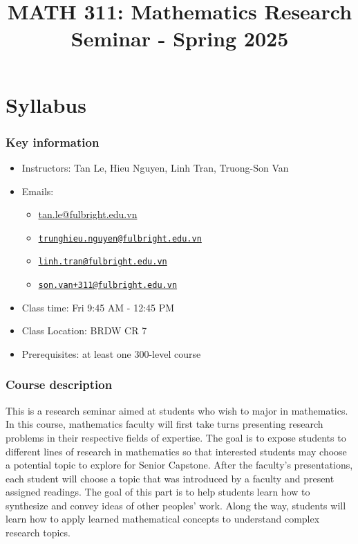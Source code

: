 \documentclass[
  openany]{book}
\title{MATH 311: Mathematics Research Seminar - Spring 2025}
\author{}
\date{\vspace{-2.5em}}
\providecommand{\tightlist}{%
  \setlength{\itemsep}{0pt}\setlength{\parskip}{0pt}}
\begin{document}
\maketitle

\chapter*{Syllabus}\label{syllabus}

\subsection*{Key information}\label{key-information}

\begin{itemize}
\tightlist
\item
  Instructors: Tan Le, Hieu Nguyen, Linh Tran, Truong-Son Van
\item
  Emails:

  \begin{itemize}
  \tightlist
  \item
    \href{mailto:tan.le@fulgright.edu.vn}{tan.le@fulbright.edu.vn}
  \item
    \href{mailto:trunghieu.nguyen@fulbright.edu.vn}{\nolinkurl{trunghieu.nguyen@fulbright.edu.vn}}
  \item
    \href{mailto:linh.tran@fulbright.edu.vn}{\nolinkurl{linh.tran@fulbright.edu.vn}}
  \item
    \href{mailto:son.van+311@fulbright.edu.vn}{\nolinkurl{son.van+311@fulbright.edu.vn}}
  \end{itemize}
\item
  Class time: Fri 9:45 AM - 12:45 PM
\item
  Class Location: BRDW CR 7
\item
  Prerequisites: at least one 300-level course
\end{itemize}

\subsection*{Course description}\label{course-description}

This is a research seminar aimed at students who wish to major in mathematics.
In this course, mathematics faculty will first take turns presenting research problems in
their respective fields of expertise. The goal is to expose students
to different lines of research in mathematics so that interested students may
choose a potential topic to explore for Senior Capstone.
After the faculty's presentations, each student will choose a topic that was introduced by a
faculty and present assigned readings.
The goal of this part is to help students learn how to synthesize and convey ideas
of other peoples' work. Along the way, students will learn how to apply learned
mathematical concepts to understand complex research topics.
\end{document}

